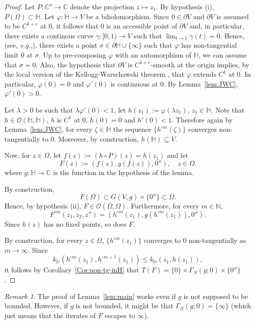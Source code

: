 \documentclass[12pt]{amsart}
\theoremstyle{definition}
\theoremstyle{remark}
\newtheorem{remark}[theorem]{Remark}
\numberwithin{equation}{section}
\def\C{\mathbb C}
\def\Ha{\mathbb H}
\begin{document}
\begin{proof}
Let $P:\C^n\to\C$ denote the projection $z \mapsto z_1$. By hypothesis (i),  $P(\Omega)\subset \mathbb H$. Let $\varphi:\mathbb H \to V$ be a biholomorphism. Since $0\in\partial V$ and $\partial V$ is assumed to be $C^{1+\varepsilon}$ at $0$, it follows that $0$ is an accessible point of $\partial V$ and, in particular, there exists a continous curve $\gamma:[0,1)\to V$ such that $\lim_{t\to 1}\gamma(t)=0$. Hence, (see, {\sl e.g.},\cite[Proposition~3.3.3]{BCDM}), there exists a point $\sigma\in \partial \Ha\cup \{\infty\}$ such that $\varphi$ has non-tangential limit $0$ at $\sigma$. Up to pre-composing $\varphi$ with an automorphism of $\Ha$, we can assume that $\sigma=0$.  Also, the hypothesis that $\partial V$ is $C^{1+\varepsilon}$-smooth at the origin {implies}, by the local version of the Kellogg-Warschawski theorem \cite[Theorem 1]{War}, {that} $\varphi$ extends $C^1$ at $0$. In particular, $\varphi(0)=0$ and $\varphi'(0)$ is  continuous at $0$. By Lemma~\ref{lem:JWC}, $\varphi'(0)>0$. 

Let $\lambda>0$ be such that $\lambda \varphi'(0) < 1$, let $h(z_1):=\varphi(\lambda z_1)$, $z_1\in \Ha$.  Note that $h\in \mathcal{O}(\mathbb H,\mathbb H)$,  $h$ is $C^1$ at $0$, $h(0)=0$ and $h'(0) <1$. Therefore again by Lemma~\ref{lem:JWC}, for every $\zeta\in \Ha$ the sequence $\{h^{\circ m}(\zeta)\}$  converges non-tangentially to $0$. Moreover, by construction, $h(\Ha)\subseteq V$.

Now, for $z\in \Omega$, let $f(z):=(h\circ P)(z)=h(z_1)$ and let 
\[
F(z):=(f(z),g(f(z)),0''), \quad z\in\Omega.
\]
 where $g:\mathbb H \to \mathbb C$ is the function in the hypothesis of the lemma.
		
By construction,
\[
F(\Omega)\subset G(V, g)\times\{0''\} \subset \Omega.
\]
Hence, by hypothesis (ii),  $F\in\mathcal{O}(\Omega,\Omega)$. Furthermore, for every $m\in \mathbb N$,
\[
F^{\circ m}(z_1,z_2,z'')=(h^{\circ m}(z_1),g(h^{\circ m}(z_1)),0'').
\]
Since  $h(z)$ has no fixed points, so does $F$. 

By construction, for every $z\in \Omega$, $\{h^{\circ m}(z_1)\}$ converges to $0$ non-tangentially as $m\to \infty$.  Since
\[
k_\Ha(h^{\circ m}(z_1), h^{\circ m+1}(z_1))\leq k_\Ha(z_1, h(z_1)), 
\]
it follows by Corollary~\ref{Cor:non-tg-inH} that $T(F)=\{0\}\times \Gamma_N(g;0)\times \{0''\}$.
\end{proof}

{\begin{remark}
The proof of Lemma~\ref{lem:main} works even if $g$ is not supposed to be bounded. However, if $g$ is not bounded, it might be that $\Gamma_N(g;0)=\{\infty\}$ (which just means that the iterates of $F$ escapes to $\infty$).
\end{remark}}
\end{document}
